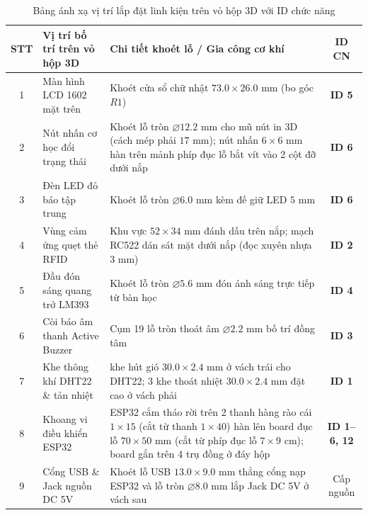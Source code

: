 \begin{table}[H]
\centering
\setlength{\tabcolsep}{5pt}
\begin{tabularx}{\textwidth}{|c|>{\raggedright\arraybackslash}p{4.6cm}|>{\raggedright\arraybackslash}X|c|}
\hline
\textbf{STT} & \textbf{Vị trí bố trí trên vỏ hộp 3D} & \textbf{Chi tiết khoét lỗ / Gia công cơ khí} & \textbf{ID CN} \\ \hline
1 & Màn hình LCD 1602 mặt trên & Khoét cửa sổ chữ nhật $73.0 \times 26.0\text{ mm}$ (bo góc $R1$) & \textbf{ID 5} \\ \hline
2 & Nút nhấn cơ học đổi trạng thái & Khoét lỗ tròn $\varnothing 12.2\text{ mm}$ cho mũ nút in 3D (cách mép phải $17\text{ mm}$); nút nhấn $6 \times 6\text{ mm}$ hàn trên mảnh phíp đục lỗ bắt vít vào 2 cột đỡ dưới nắp & \textbf{ID 6} \\ \hline
3 & Đèn LED đỏ báo tập trung & Khoét lỗ tròn $\varnothing 6.0\text{ mm}$ kèm đế giữ LED $5\text{ mm}$ & \textbf{ID 6} \\ \hline
4 & Vùng cảm ứng quẹt thẻ RFID & Khu vực $52 \times 34\text{ mm}$ đánh dấu trên nắp; mạch RC522 dán sát mặt dưới nắp (đọc xuyên nhựa $3\text{ mm}$) & \textbf{ID 2} \\ \hline
5 & Đầu đón sáng quang trở LM393 & Khoét lỗ tròn $\varnothing 5.6\text{ mm}$ đón ánh sáng trực tiếp từ bàn học & \textbf{ID 4} \\ \hline
6 & Còi báo âm thanh Active Buzzer & Cụm 19 lỗ tròn thoát âm $\varnothing 2.2\text{ mm}$ bố trí đồng tâm & \textbf{ID 3} \\ \hline
7 & Khe thông khí DHT22 \& tản nhiệt & 5 khe hút gió $30.0 \times 2.4\text{ mm}$ ở vách trái cho DHT22; 3 khe thoát nhiệt $30.0 \times 2.4\text{ mm}$ đặt cao ở vách phải & \textbf{ID 1} \\ \hline
8 & Khoang vi điều khiển ESP32 & ESP32 cắm tháo rời trên 2 thanh hàng rào cái $1 \times 15$ (cắt từ thanh $1 \times 40$) hàn lên board đục lỗ $70 \times 50\text{ mm}$ (cắt từ phíp đục lỗ $7 \times 9\text{ cm}$); board gắn trên 4 trụ đồng ở đáy hộp & \textbf{ID 1--6, 12} \\ \hline
9 & Cổng USB \& Jack nguồn DC 5V & Khoét lỗ USB $13.0 \times 9.0\text{ mm}$ thẳng cổng nạp ESP32 và lỗ tròn $\varnothing 8.0\text{ mm}$ lắp Jack DC 5V ở vách sau & Cấp nguồn \\ \hline
\end{tabularx}
\caption{Bảng ánh xạ vị trí lắp đặt linh kiện trên vỏ hộp 3D với ID chức năng}
\label{tab:map_3d_chuc_nang}
\end{table}

